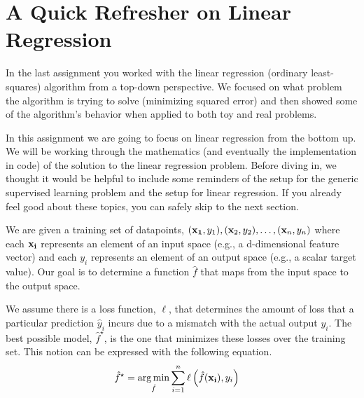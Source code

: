 \documentclass[assignment02_Solutions]{subfiles}
\begin{document}
\section{A Quick Refresher on Linear Regression}

In the last assignment you worked with the linear regression (ordinary least-squares) algorithm from a top-down perspective.  We focused on what problem the algorithm is trying to solve (minimizing squared error) and then showed some of the algorithm's behavior when applied to both toy and real problems.

In this assignment we are going to focus on linear regression from the bottom up.  We will be working through the mathematics (and eventually the implementation in code) of the solution to the linear regression problem.  Before diving in, we thought it would be helpful to include some reminders of the setup for the generic supervised learning problem and the setup for linear regression.  If you already feel good about these topics, you can safely skip to the next section.

\vspace{1em}

\begin{recall}
We are given a training set of datapoints, $(\mathbf{x_1}, y_1), (\mathbf{x}_2, y_2), \ldots, (\mathbf{x}_n, y_n)$ where each $\mathbf{x_i}$ represents an element of an input space (e.g., a d-dimensional feature vector) and each $y_i$ represents an element of an output space (e.g., a scalar target value).  Our goal is to determine a function $\hat{f}$ that maps from the input space to the output space.

We assume there is a loss function, $\ell$, that determines the amount of loss that a particular prediction $\hat{y}_i$ incurs due to a mismatch with the actual output $y_i$.  The best possible model, $\hat{f}^\star$, is the one that minimizes these losses over the training set.  This notion can be expressed with the following equation.
\begin{align}
\hat{f}^\star &= \operatorname*{arg\,min}_{\hat{f}} \sum_{i=1}^n \ell \left ( \hat{f}(\mathbf{x_i}), y_i \right )
\end{align} 

\end{recall}

\vspace{1em}
\end{document}
